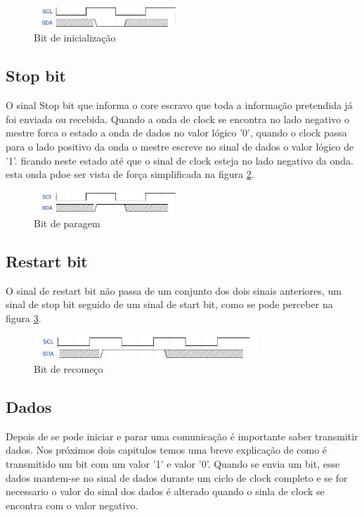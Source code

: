  \begin{figure}[!htb]
   \centering
   \includegraphics[width=0.50\textwidth]{ondas/I2C_S.pdf}
   \caption[Bit de inicialização]{Bit de inicialização}
   \label{fig:Start_I2C}
 \end{figure}

\subsection{Stop bit}
O sinal Stop bit que informa o core escravo que toda a informação pretendida já foi enviada ou recebida. Quando a onda de clock se encontra no lado negativo o mestre forca o estado a onda de dados no valor lógico '0', quando o clock passa para o lado positivo da onda o mestre escreve no sinal de dados o valor lógico de '1'. ficando neste estado até que o sinal de clock esteja no lado negativo da onda. esta onda pdoe ser vista de força simplificada na figura \ref{fig:Stop_I2C}.
\label{i2c_stop}
 \begin{figure}[!htb]
   \centering
   \includegraphics[width=0.50\textwidth]{ondas/I2C_ST.pdf}
   \caption[Bit de paragem]{Bit de paragem}
   \label{fig:Stop_I2C}
 \end{figure}

\subsection{Restart bit}
O sinal de restart bit não passa de um conjunto dos dois sinais anteriores, um sinal de stop bit seguido de um sinal de start bit, como se pode perceber na figura \ref{fig:Restart_I2C}.
 \begin{figure}[!htb]
   \centering
   \includegraphics[width=0.75\textwidth]{ondas/I2C_R.pdf} %
   \caption[Bit de recomeço]{Bit de recomeço}
   \label{fig:Restart_I2C}
 \end{figure}

\subsection{Dados}
Depois de se pode iniciar e parar uma comunicação é importante saber transmitir dados. Nos próximos dois capitulos temos uma breve explicação de como é transmitido um bit com um valor '1' e valor '0'. Quando se envia um bit, esse dados mantem-se no sinal de dados durante um ciclo de clock completo e se for necessario o valor do sinal dos dados é alterado quando o sinla de clock se encontra com o valor negativo.


